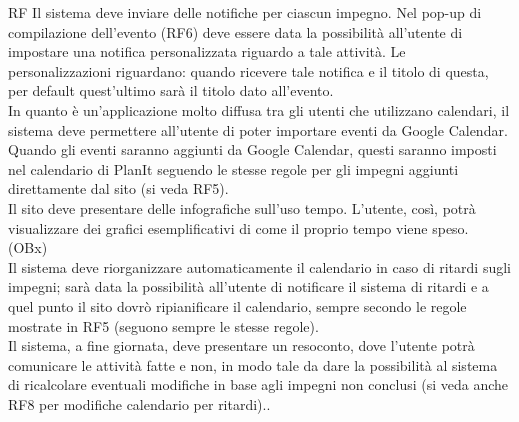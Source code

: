 \begin {listaPersonale}{RF}
Il sistema deve inviare delle notifiche per ciascun impegno. Nel pop-up di compilazione dell'evento (RF6) deve essere data la possibilità all'utente di impostare una notifica personalizzata riguardo a tale attività. Le personalizzazioni riguardano: quando ricevere tale notifica e il titolo di questa, per default quest'ultimo sarà il titolo dato all'evento.
 \\
In quanto è un'applicazione molto diffusa tra gli utenti che utilizzano calendari, il sistema deve permettere all'utente di poter importare eventi da Google Calendar. Quando gli eventi saranno aggiunti da Google Calendar, questi saranno imposti nel calendario di PlanIt seguendo le stesse regole per gli impegni aggiunti direttamente dal sito (si veda RF5).
 \\
Il sito deve presentare delle infografiche sull'uso tempo. L'utente, così, potrà visualizzare dei grafici esemplificativi di come il proprio tempo viene speso. (OBx)
 \\
Il sistema deve riorganizzare automaticamente il calendario in caso di ritardi sugli impegni; sarà data la possibilità all'utente di notificare il sistema di ritardi e a quel punto il sito dovrò ripianificare il calendario, sempre secondo le regole mostrate in RF5 (seguono sempre le stesse regole).
 \\
Il sistema, a fine giornata, deve presentare un resoconto, dove l'utente potrà comunicare le attività fatte e non, in modo tale da dare la possibilità al sistema di ricalcolare eventuali modifiche in base agli impegni non conclusi (si veda anche RF8 per modifiche calendario per ritardi)..

\end{listaPersonale}